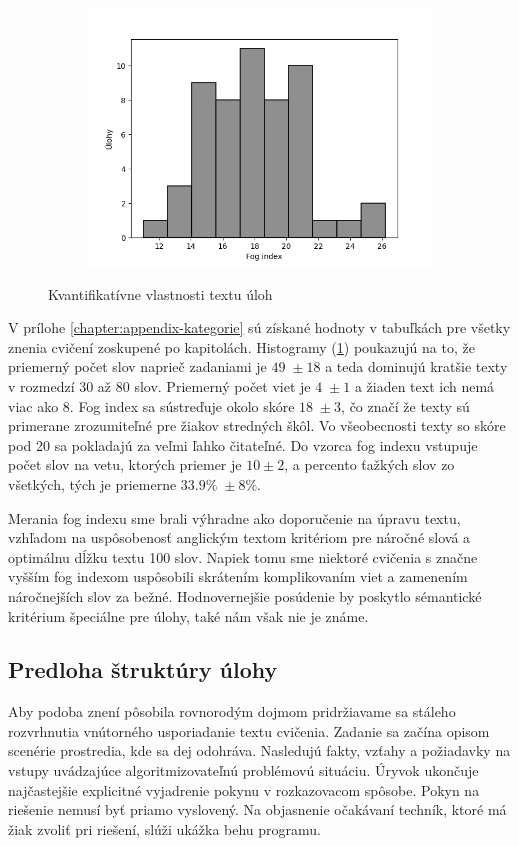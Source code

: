 \begin{figure}[h]
\begin{subfigure}[b]{0.32\textwidth}
\includegraphics[width=\textwidth]{assets/fog.png}
\end{subfigure}
\hfill
\caption{Kvantifikatívne vlastnosti textu úloh}
\label{fig:text-metrics}
\end{figure}

V prílohe \ref{chapter:appendix-kategorie} sú získané hodnoty v tabuľkách pre všetky znenia cvičení zoskupené po kapitolách. Histogramy (\ref{fig:text-metrics}) poukazujú na to, že priemerný počet slov naprieč zadaniami je $49\; \pm 18$ a teda dominujú kratšie texty v rozmedzí $30$ až $80$ slov. Priemerný počet viet je $4\; \pm 1$ a žiaden text ich nemá viac ako $8$. Fog index sa sústreďuje okolo skóre $18\; \pm 3$, čo značí že texty sú primerane zrozumiteľné pre žiakov stredných škôl. Vo všeobecnosti texty so skóre pod 20 sa pokladajú za veľmi ľahko čitateľné. Do vzorca fog indexu vstupuje počet slov na vetu, ktorých priemer je $10 \pm 2$, a percento ťažkých slov zo všetkých, tých je priemerne $33.9\%\; \pm 8\%$.

Merania fog indexu sme brali výhradne ako doporučenie na úpravu textu, vzhľadom na uspôsobenosť anglickým textom kritériom pre náročné slová a optimálnu dĺžku textu 100 slov. Napiek tomu sme niektoré cvičenia s značne vyšším fog indexom uspôsobili skrátením komplikovaním viet a zamenením náročnejších slov za bežné. Hodnovernejšie posúdenie by poskytlo sémantické kritérium špeciálne pre úlohy, také nám však nie je známe. 

\subsection{Predloha štruktúry úlohy}
Aby podoba znení pôsobila rovnorodým dojmom pridržiavame sa stáleho rozvrhnutia vnútorného usporiadanie textu cvičenia. Zadanie sa začína opisom scenérie prostredia, kde sa dej odohráva. Nasledujú fakty, vzťahy a požiadavky na vstupy uvádzajúce algoritmizovateľnú problémovú situáciu. Úryvok ukončuje najčastejšie explicitné vyjadrenie pokynu v rozkazovacom spôsobe. Pokyn na riešenie nemusí byť priamo vyslovený. Na objasnenie očakávaní techník, ktoré má žiak zvoliť pri riešení, slúži ukážka behu programu. 

